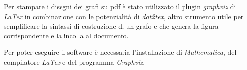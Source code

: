 \documentclass{amsart}
\theoremstyle{definition}
\theoremstyle{remark}
\theoremstyle{remark}
\theoremstyle{remark}
\theoremstyle{remark}
\theoremstyle{definition}
\theoremstyle{remark}
\theoremstyle{definition}
\theoremstyle{definition}
\begin{document}
Per stampare i disegni dei grafi su pdf \`e stato utilizzato il plugin \emph{graphviz} di \emph{LaTex} in combinazione con le potenzialit\`a di \emph{dot2tex}, altro strumento utile per semplificare la sintassi di costruzione di un grafo e che genera la figura corrispondente e la incolla al documento. 	

Per poter eseguire il software \`e necessaria l'installazione di \emph{Mathematica}, del compilatore \emph{LaTex} e del programma \emph{Graphviz}.\\ 

\end{document}
